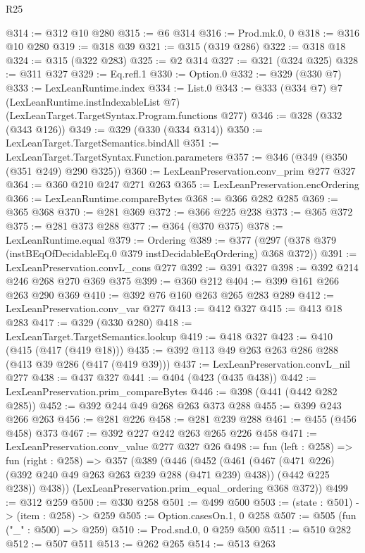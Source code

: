 \begin{lexlean}{R25}
\begin{coremodule}
@314 := @312 @10 @280
@315 := @6 @314
@316 := Prod.mk.{0, 0}
@318 := @316 @10 @280
@319 := @318 @39
@321 := @315 (@319 @286)
@322 := @318 @18
@324 := @315 (@322 @283)
@325 := @2 @314
@327 := @321 (@324 @325)
@328 := @311 @327
@329 := Eq.refl.{1}
@330 := Option.{0}
@332 := @329 (@330 @7)
@333 := LexLeanRuntime.index
@334 := List.{0}
@343 := @333
    (@334 @7)
    @7
    (LexLeanRuntime.instIndexableList @7)
    (LexLeanTarget.TargetSyntax.Program.functions @277)
@346 := @328 (@332 (@343 @126))
@349 := @329 (@330 (@334 @314))
@350 := LexLeanTarget.TargetSemantics.bindAll
@351 := LexLeanTarget.TargetSyntax.Function.parameters
@357 := @346 (@349 (@350 (@351 @249) @290 @325))
@360 := LexLeanPreservation.conv_prim @277 @327
@364 := @360 @210 @247 @271 @263
@365 := LexLeanPreservation.encOrdering
@366 := LexLeanRuntime.compareBytes
@368 := @366 @282 @285
@369 := @365 @368
@370 := @281 @369
@372 := @366 @225 @238
@373 := @365 @372
@375 := @281 @373 @288
@377 := @364 (@370 @375)
@378 := LexLeanRuntime.equal
@379 := Ordering
@389 := @377 (@297 (@378 @379 (instBEqOfDecidableEq.{0} @379 instDecidableEqOrdering) @368 @372))
@391 := LexLeanPreservation.convL_cons @277
@392 := @391 @327
@398 := @392 @214 @246 @268 @270 @369 @375
@399 := @360 @212
@404 := @399 @161 @266 @263 @290 @369
@410 := @392 @76 @160 @263 @265 @283 @289
@412 := LexLeanPreservation.conv_var @277
@413 := @412 @327
@415 := @413 @18 @283
@417 := @329 (@330 @280)
@418 := LexLeanTarget.TargetSemantics.lookup
@419 := @418 @327
@423 := @410 (@415 (@417 (@419 @18)))
@435 := @392 @113 @49 @263 @263 @286 @288 (@413 @39 @286 (@417 (@419 @39)))
@437 := LexLeanPreservation.convL_nil @277
@438 := @437 @327
@441 := @404 (@423 (@435 @438))
@442 := LexLeanPreservation.prim_compareBytes
@446 := @398 (@441 (@442 @282 @285))
@452 := @392 @244 @49 @268 @263 @373 @288
@455 := @399 @243 @266 @263
@456 := @281 @226
@458 := @281 @239 @288
@461 := @455 (@456 @458) @373
@467 := @392 @227 @242 @263 @265 @226 @458
@471 := LexLeanPreservation.conv_value @277 @327 @26
@498 := fun (left : @258) =>
  fun (right : @258) =>
  @357
    (@389
      (@446
        (@452
          (@461
            (@467 (@471 @226) (@392 @240 @49 @263 @263 @239 @288 (@471 @239) @438))
            (@442 @225 @238))
          @438))
      (LexLeanPreservation.prim_equal_ordering @368 @372))
@499 := @312 @259
@500 := @330 @258
@501 := @499 @500
@503 := (state : @501) -> (item : @258) -> @259
@505 := Option.casesOn.{1, 0} @258
@507 := @505 (fun ("_" : @500) => @259)
@510 := Prod.snd.{0, 0} @259 @500
@511 := @510 @282
@512 := @507 @511
@513 := @262 @265
@514 := @513 @263

\end{coremodule}
\end{lexlean}
